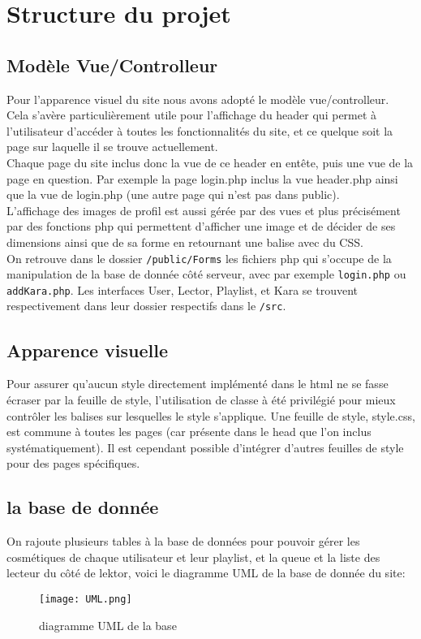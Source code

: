 \section{Structure du projet}
\subsection{Modèle Vue/Controlleur}
Pour l'apparence visuel du site nous avons adopté le modèle vue/controlleur. \\
Cela s'avère particulièrement utile pour l'affichage du header qui permet à l'utilisateur d'accéder à toutes les fonctionnalités du site, et ce quelque soit la page sur laquelle il se trouve actuellement.\\
Chaque page du site inclus donc la vue de ce header en entête, puis une vue de la page en question.
Par exemple la page login.php inclus la vue header.php ainsi que la vue de login.php (une autre page qui n'est pas dans public).\\
L'affichage des images de profil est aussi gérée par des vues et plus précisément par des fonctions php qui permettent d'afficher une image et de décider de ses dimensions ainsi que de sa forme en retournant une balise avec du CSS.\\
On retrouve dans le dossier \texttt{/public/Forms} les fichiers php qui s'occupe de la manipulation de la base de donnée côté serveur, avec par exemple \texttt{login.php} ou \texttt{addKara.php}.\newline
Les interfaces User, Lector, Playlist, et Kara se trouvent respectivement dans leur dossier respectifs dans le \texttt{/src}.


\subsection{Apparence visuelle}
Pour assurer qu'aucun style directement implémenté dans le html ne se fasse écraser par la feuille de style, l'utilisation de classe à été privilégié pour mieux contrôler les balises sur lesquelles le style s'applique. Une feuille de style, style.css, est commune à toutes les pages (car présente dans le head que l'on inclus systématiquement). Il est cependant possible d'intégrer d'autres feuilles de style pour des pages spécifiques.

\subsection{la base de donnée}
On rajoute plusieurs tables à la base de données pour pouvoir gérer les cosmétiques de chaque utilisateur et leur playlist, et la queue et la liste des lecteur du côté de lektor, voici le diagramme UML de la base de donnée du site:
\newline
\begin{figure}[h!]
\centering
\texttt{[image: UML.png]}
\caption{diagramme UML de la base}
\label{fig:diagramme UML}
\end{figure}
